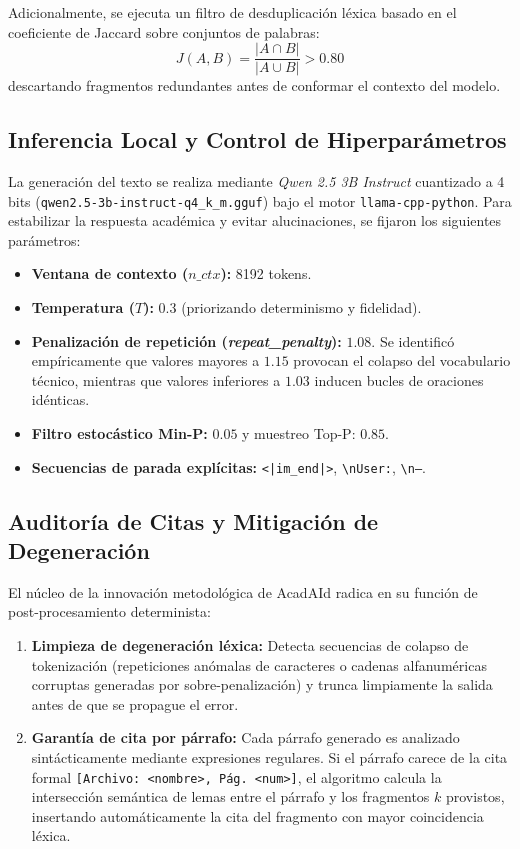 \documentclass[12pt,a4paper]{article}
\begin{document}
Adicionalmente, se ejecuta un filtro de desduplicación léxica basado en el coeficiente de Jaccard \cite{burgos2025} sobre conjuntos de palabras:
\begin{equation}
J(A, B) = \frac{|A \cap B|}{|A \cup B|} > 0.80
\end{equation}
descartando fragmentos redundantes antes de conformar el contexto del modelo.

\subsection{Inferencia Local y Control de Hiperparámetros}
La generación del texto se realiza mediante \textit{Qwen 2.5 3B Instruct} cuantizado a 4 bits (\texttt{qwen2.5-3b-instruct-q4\_k\_m.gguf}) bajo el motor \texttt{llama-cpp-python}. Para estabilizar la respuesta académica y evitar alucinaciones, se fijaron los siguientes parámetros:
\begin{itemize}[noitemsep]
    \item \textbf{Ventana de contexto ($n\_ctx$):} 8192 tokens.
    \item \textbf{Temperatura ($T$):} $0.3$ (priorizando determinismo y fidelidad).
    \item \textbf{Penalización de repetición (\textit{repeat\_penalty}):} $1.08$. Se identificó empíricamente que valores mayores a $1.15$ provocan el colapso del vocabulario técnico, mientras que valores inferiores a $1.03$ inducen bucles de oraciones idénticas.
    \item \textbf{Filtro estocástico Min-P:} $0.05$ y muestreo Top-P: $0.85$.
    \item \textbf{Secuencias de parada explícitas:} \texttt{<|im\_end|>}, \texttt{\textbackslash nUser:}, \texttt{\textbackslash n---}.
\end{itemize}

\subsection{Auditoría de Citas y Mitigación de Degeneración}
El núcleo de la innovación metodológica de AcadAId radica en su función de post-procesamiento determinista:
\begin{enumerate}
    \item \textbf{Limpieza de degeneración léxica:} Detecta secuencias de colapso de tokenización (repeticiones anómalas de caracteres o cadenas alfanuméricas corruptas generadas por sobre-penalización) y trunca limpiamente la salida antes de que se propague el error.
    \item \textbf{Garantía de cita por párrafo:} Cada párrafo generado es analizado sintácticamente mediante expresiones regulares. Si el párrafo carece de la cita formal \texttt{[Archivo: <nombre>, Pág. <num>]}, el algoritmo calcula la intersección semántica de lemas entre el párrafo y los fragmentos $k$ provistos, insertando automáticamente la cita del fragmento con mayor coincidencia léxica.
\end{enumerate}
\end{document}
